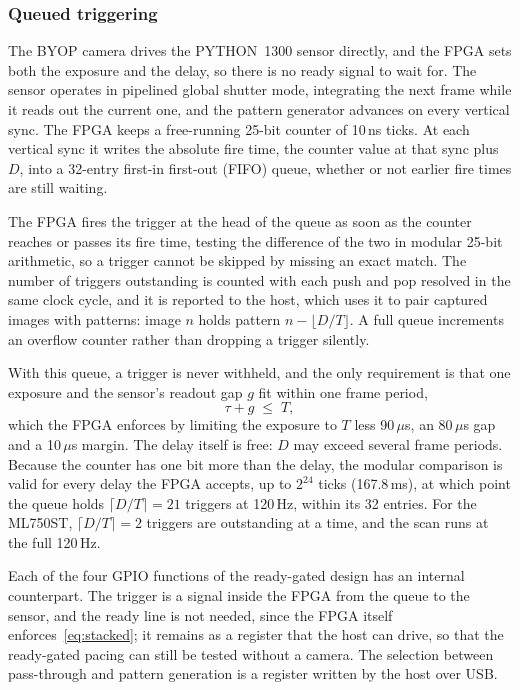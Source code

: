 \documentclass[10pt,journal,compsoc]{IEEEtran}
\newcommand{\SI}[2]{#1\,#2}
\newcommand{\micro}{\ensuremath{\mu}}
\newcommand{\nano}{n}\newcommand{\milli}{m}\newcommand{\mega}{M}
\newcommand{\second}{s}\newcommand{\hertz}{Hz}\newcommand{\metre}{m}
\begin{document}
\subsubsection{Queued triggering}
The BYOP camera drives the PYTHON~1300 sensor directly, and the FPGA sets both the exposure and
the delay, so there is no ready signal to wait for. The sensor operates in pipelined global
shutter mode, integrating the next frame while it reads out the current one, and the pattern
generator advances on every vertical sync. The FPGA keeps a free-running 25-bit counter of
\SI{10}{\nano\second} ticks. At each vertical sync it writes the absolute fire time, the counter
value at that sync plus $D$, into a 32-entry first-in first-out (FIFO) queue, whether or not
earlier fire times are still waiting.

The FPGA fires the trigger at the head of the queue as soon as the counter reaches or passes its
fire time, testing the difference of the two in modular 25-bit arithmetic, so a trigger cannot be
skipped by missing an exact match. The number of triggers outstanding is counted with each push
and pop resolved in the same clock cycle, and it is reported to the host, which uses it to pair
captured images with patterns: image $n$ holds pattern $n-\lfloor D/T\rfloor$. A full queue
increments an overflow counter rather than dropping a trigger silently.

With this queue, a trigger is never withheld, and the only requirement is that one exposure and
the sensor's readout gap $g$ fit within one frame period,
\begin{equation}
\tau + g \;\le\; T,
\label{eq:stacked}
\end{equation}
which the FPGA enforces by limiting the exposure to $T$ less \SI{90}{\micro\second}, an
\SI{80}{\micro\second} gap and a \SI{10}{\micro\second} margin. The delay itself is free: $D$
may exceed several frame periods. Because the counter has one bit more than the delay, the
modular comparison is valid for every delay the FPGA accepts, up to $2^{24}$ ticks
(\SI{167.8}{\milli\second}), at which point the queue holds $\lceil D/T\rceil=21$ triggers at
\SI{120}{\hertz}, within its 32 entries. For the ML750ST, $\lceil D/T\rceil=2$ triggers are
outstanding at a time, and the scan runs at the full \SI{120}{\hertz}.

Each of the four GPIO functions of the ready-gated design has an internal counterpart. The
trigger is a signal inside the FPGA from the queue to the sensor, and the ready line is not
needed, since the FPGA itself enforces~\eqref{eq:stacked}; it remains as a register that the host
can drive, so that the ready-gated pacing can still be tested without a camera. The selection
between pass-through and pattern generation is a register written by the host over USB.
\end{document}
